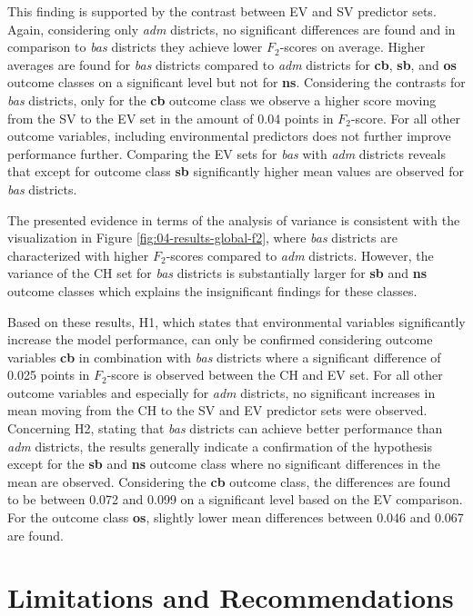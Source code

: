 \documentclass[a4paper,11pt]{article}
\begin{document}
This finding is supported by the contrast between EV and SV predictor sets.
Again, considering only \emph{adm} districts, no significant differences are found and
in comparison to \emph{bas} districts they achieve lower \(F_2\)-scores on average.
Higher averages are found for \emph{bas} districts compared to \emph{adm} districts
for \textbf{cb}, \textbf{sb}, and \textbf{os} outcome classes on a significant level but not
for \textbf{ns}. Considering the contrasts for \emph{bas} districts, only for the \textbf{cb}
outcome class we observe a higher score moving from the SV to the EV set in the
amount of 0.04 points in \(F_2\)-score. For all other outcome variables, including
environmental predictors does not further improve performance further. Comparing
the EV sets for \emph{bas} with \emph{adm} districts reveals that except for outcome class
\textbf{sb} significantly higher mean values are observed for \emph{bas} districts.

The presented evidence in terms of the analysis of variance is consistent
with the visualization in Figure \ref{fig:04-results-global-f2}, where \emph{bas}
districts are characterized with higher \(F_2\)-scores compared to \emph{adm} districts.
However, the variance of the CH set for \emph{bas} districts is substantially larger
for \textbf{sb} and \textbf{ns} outcome classes which explains the insignificant findings
for these classes.

Based on these results, H1, which states that environmental variables
significantly increase the model performance, can only be confirmed considering
outcome variables \textbf{cb} in combination with \emph{bas} districts where a significant
difference of 0.025 points in \(F_2\)-score is observed between the CH and EV set.
For all other outcome variables and especially for \emph{adm} districts, no significant
increases in mean moving from the CH to the SV and EV predictor sets were observed.
Concerning H2, stating that \emph{bas} districts can achieve better performance
than \emph{adm} districts, the results generally indicate a confirmation of the
hypothesis except for the \textbf{sb} and \textbf{ns} outcome class where no significant
differences in the mean are observed. Considering the \textbf{cb} outcome class,
the differences are found to be between 0.072 and 0.099 on a significant level
based on the EV comparison. For the outcome class \textbf{os}, slightly lower mean
differences between 0.046 and 0.067 are found.

\newpage

\hypertarget{limitations-and-recommendations}{%
\section{Limitations and Recommendations}\label{limitations-and-recommendations}}
\end{document}
